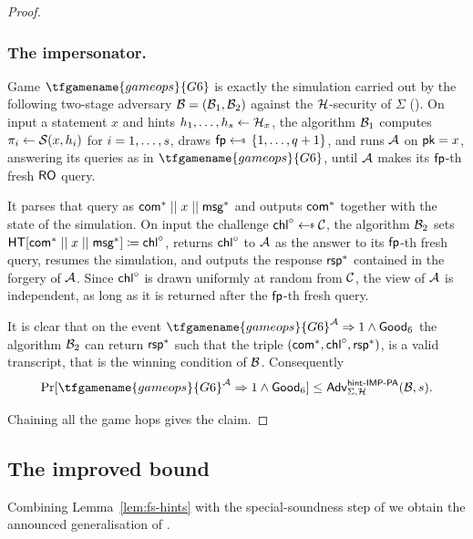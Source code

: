 \begin{proof}
\subsubsection*{The impersonator.}
Game $\tfgamename{gameops}{G6}$ is exactly the simulation carried out by the following two-stage adversary $\mathcal{B} = (\mathcal{B}_1, \mathcal{B}_2)$ against the $\mathcal{H}$-\hintIMPPA security of $\Sigma$ ().
On input a statement $x$ and hints $h_1 , \ldots, h_{s} \gets \mathcal{H}_x$, the algorithm $\mathcal{B}_1$ computes $\pi_i \gets \operatorname{\mathcal{S}}(x, h_i)$ for $i = 1 , \ldots, s$, draws $\fpguess \sample \set{1 \until \numRO+1}$, and runs $\mathcal{A}$ on $\textsf{pk} = x$, answering its queries as in $\tfgamename{gameops}{G6}$, until $\mathcal{A}$ makes its $\mathsf{fp}$-th fresh $\mathsf{RO}$ query. 

It parses that query as $\mathsf{com}^* \mathrel{||} x \mathrel{||} \textsf{msg}^*$ and outputs $\mathsf{com}^*$ together with the state of the simulation. 
On input the challenge $\chall^\circ \sample \cC$, the algorithm $\mathcal{B}_2$ sets $\mathsf{HT}[\mathsf{com}^* \mathrel{||} x \mathrel{||} \textsf{msg}^*] \coloneqq \mathsf{chl}^\circ$, returns $\mathsf{chl}^\circ$ to $\mathcal{A}$ as the answer to its $\mathsf{fp}$-th fresh query, resumes the simulation, and outputs the response $\mathsf{rsp}^*$ contained in the forgery of $\mathcal{A}$.
Since $\mathsf{chl}^\circ$ is drawn uniformly at random from $\mathcal{C}$, the view of $\mathcal{A}$ is independent, as long as it is returned after the $\mathsf{fp}$-th fresh query.

It is clear that on the event $\tfgamename{gameops}{G6}^\adv \Rightarrow 1 \wedge \goodev_6$ the algorithm $\mathcal{B}_2$ can return $\mathsf{rsp}^*$ such that the triple $(\mathsf{com}^*, \mathsf{chl}^\circ, \mathsf{rsp}^*)$, is a valid transcript, that is the winning condition of $\mathcal{B}$. 
Consequently
\begin{equation}\label{eq:g6b}
    \Pr[\tfgamename{gameops}{G6}^\adv \Rightarrow 1 \wedge \goodev_6]
    \leq \hintimppaadv{\Sigma}{\hintdistr}{\bdv}{\numOSign}.
\end{equation}

Chaining all the game hops gives the claim.
\end{proof}


\subsection{The improved \EUFCMA bound}\label{sec:eufcma-gen}

Combining Lemma~\ref{lem:fs-hints} with the special-soundness step
of  we obtain the announced generalisation
of .

